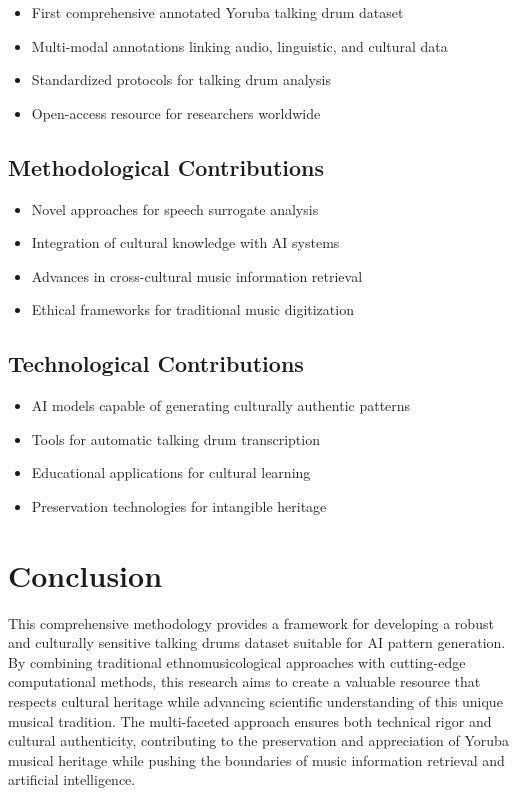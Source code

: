 \documentclass[12pt]{article}
\begin{document}
\begin{itemize}
    \item First comprehensive annotated Yoruba talking drum dataset
    \item Multi-modal annotations linking audio, linguistic, and cultural data
    \item Standardized protocols for talking drum analysis
    \item Open-access resource for researchers worldwide
\end{itemize}

\subsection{Methodological Contributions}

\begin{itemize}
    \item Novel approaches for speech surrogate analysis
    \item Integration of cultural knowledge with AI systems
    \item Advances in cross-cultural music information retrieval
    \item Ethical frameworks for traditional music digitization
\end{itemize}

\subsection{Technological Contributions}

\begin{itemize}
    \item AI models capable of generating culturally authentic patterns
    \item Tools for automatic talking drum transcription
    \item Educational applications for cultural learning
    \item Preservation technologies for intangible heritage
\end{itemize}

\section{Conclusion}

This comprehensive methodology provides a framework for developing a robust and culturally sensitive talking drums dataset suitable for AI pattern generation. By combining traditional ethnomusicological approaches with cutting-edge computational methods, this research aims to create a valuable resource that respects cultural heritage while advancing scientific understanding of this unique musical tradition. The multi-faceted approach ensures both technical rigor and cultural authenticity, contributing to the preservation and appreciation of Yoruba musical heritage while pushing the boundaries of music information retrieval and artificial intelligence.
\end{document}
